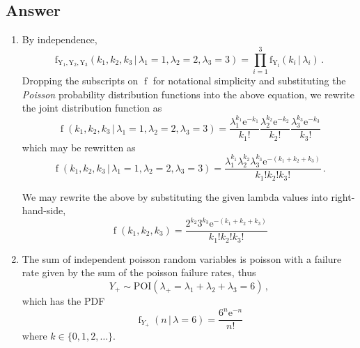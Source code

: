 \documentclass[12pt]{fphw}[final]
\begin{document}
\subsection*{Answer}
\begin{enumerate} %
	\item By independence,
    \begin{equation}
        \operatorname{f_{Y_1,Y_2,Y_3}}(k_1,k_2,k_3 \,\vert\, \lambda_1\!=\!1,\lambda_2\!=\!2,\lambda_3\!=\!3)
            = \prod_{i=1}^{3} \operatorname{f_{Y_i}}(k_i \,\vert\, \lambda_i)\,.
    \end{equation}
	Dropping the subscripts on $\operatorname{f}$ for notational simplicity and substituting the \emph{Poisson} probability distribution functions into the above equation, we rewrite the joint distribution function as
	\begin{equation}
		\operatorname{f}(k_1,k_2,k_3 \,\vert\, \lambda_1\!=\!1,\lambda_2\!=\!2,\lambda_3\!=\!3) = \frac{\lambda_1^{k_1} \mathrm{e}^{-k_1}}{k_1!}\frac{\lambda_2^{k_2} \mathrm{e}^{-k_2}}{k_2!}\frac{\lambda_3^{k_3} \mathrm{e}^{-k_3}}{k_3!}
	\end{equation}
	which may be rewritten as
	\begin{equation}
		\operatorname{f}(k_1,k_2,k_3 \,\vert\, \lambda_1\!=\!1,\lambda_2\!=\!2,\lambda_3\!=\!3) =
        \frac{\lambda_1^{k_1}\lambda_2^{k_2}\lambda_3^{k_3} \mathrm{e}^{-(k_1+k_2+k_3)}}{k_1! k_2! k_3!}\,.
	\end{equation}
	
	We may rewrite the above by substituting the given lambda values into right-hand-side,
	\begin{equation}
		\operatorname{f}(k_1,k_2,k_3) = \frac{2^{k_2}3^{k_3} \mathrm{e}^{-(k_1+k_2+k_3)}}{k_1! k_2! k_3!}
	\end{equation}
	
	\item The sum of independent poisson random variables is poisson with a failure rate given by the sum of the poisson failure rates, thus
	\begin{equation}
		Y_{+} \sim \mathrm{POI}(\lambda_{+} = \lambda_1 + \lambda_2 + \lambda_3 = 6)\,,
	\end{equation}
	which has the PDF
	\begin{equation}
		\operatorname{f}_{Y_{+}}(n \,\vert\, \lambda = 6) = \frac{6^{n} \mathrm{e}^{-n}}{n!}
	\end{equation}
	where $k \in \{0,1,2,\ldots\}$.
	

\end{enumerate}
\end{document}
